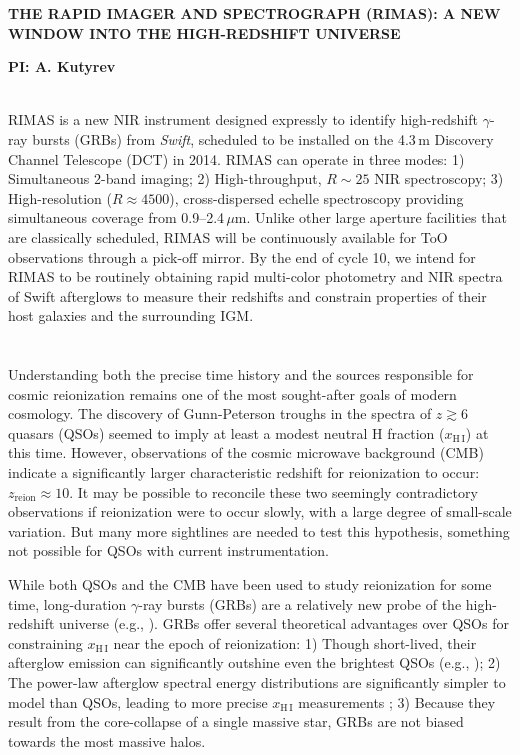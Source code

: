 \documentclass[letterpaper,11pt]{article}
\begin{document}
\pagestyle{plain}

\begin{center} 
\bfseries\uppercase{The Rapid IMAger and Spectrograph (RIMAS): A New Window
	into the High-Redshift Universe}
\end{center}
\vspace{-0.3cm}
\centerline{\bf PI: {A. Kutyrev}}
 
\smallskip\\
RIMAS is a new NIR instrument designed expressly to identify high-redshift 
$\gamma$-ray bursts (GRBs) from \textit{Swift}, scheduled to be installed on the 
4.3\,m Discovery Channel Telescope (DCT) in 2014. RIMAS can operate in three modes: 1) 
Simultaneous 2-band imaging; 2) High-throughput, $R \sim 25$ NIR spectroscopy; 3) 
High-resolution ($R \approx 4500$), cross-dispersed echelle spectroscopy providing 
simultaneous coverage from 0.9--2.4\,$\mu$m. Unlike other large aperture facilities that 
are classically scheduled, RIMAS will be continuously available for ToO observations 
through a pick-off mirror. By the end of cycle 10, we intend for RIMAS to be routinely 
obtaining rapid multi-color photometry and NIR spectra of Swift afterglows to measure 
their redshifts and constrain properties of their host galaxies and the surrounding 
IGM. \\

\smallskip\\
\smallskip\\
Understanding both the precise time history and the sources responsible for cosmic
reionization remains one of the most sought-after goals of modern cosmology.  The 
discovery of Gunn-Peterson troughs in the spectra of $z \gtrsim 6$ quasars 
(QSOs\cite{bfw+01}) seemed to imply at least a modest neutral H fraction 
($x_{\mathrm{H\,I}}$) at this time.  However, observations of the cosmic microwave
background (CMB\cite{hlk+13}) indicate a significantly larger characteristic redshift 
for reionization to occur: $z_\mathrm{reion} \approx 10$.  It may be 
possible to reconcile these two seemingly contradictory observations if reionization
were to occur slowly, with a large degree of small-scale variation.  But many more
sightlines are needed to test this hypothesis, something not possible for QSOs
with current instrumentation.

While both QSOs and the CMB have been used to study reionization for some time, 
long-duration $\gamma$-ray bursts (GRBs) are a relatively new probe of the high-redshift 
universe (e.g., \cite{lr00}).  GRBs offer several theoretical advantages over QSOs
for constraining $x_{\mathrm{H\,I}}$ near the epoch of reionization: 1) Though
short-lived, their afterglow emission can significantly outshine even the brightest
QSOs (e.g., \cite{rks+08,bpl+09,kmk07}); 2) The power-law afterglow spectral energy 
distributions are significantly simpler to model than QSOs, leading to more precise 
$x_{\mathrm{H\,I}}$ measurements \cite{mlz+08}; 3) Because they result from the 
core-collapse of a single massive star, GRBs are not biased towards the most massive halos\cite{mlz+08}.
\end{document}
